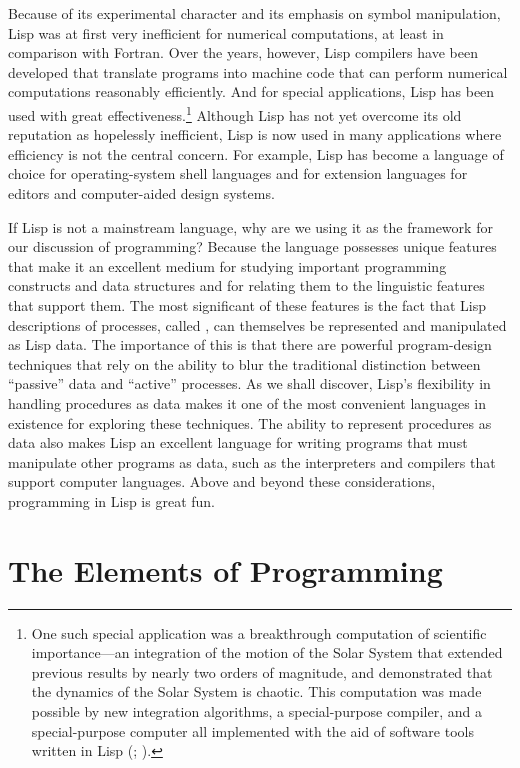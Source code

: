 Because of its experimental character and its emphasis on symbol manipulation,
Lisp was at first very inefficient for numerical computations, at least in
comparison with Fortran. Over the years, however, Lisp compilers have been
developed that translate programs into machine code that can perform numerical
computations reasonably efficiently. And for special applications, Lisp has
been used with great effectiveness.\footnote{One such special application was a
breakthrough computation of scientific importance---an integration of the
motion of the Solar System that extended previous results by nearly two orders
of magnitude, and demonstrated that the dynamics of the Solar System is
chaotic. This computation was made possible by new integration algorithms, a
special-purpose compiler, and a special-purpose computer all implemented with
the aid of software tools written in Lisp (; ).}
Although Lisp has not yet overcome its old reputation as
hopelessly inefficient, Lisp is now used in many applications where efficiency
is not the central concern. For example, Lisp has become a language of choice
for operating-system shell languages and for extension languages for editors
and computer-aided design systems.

If Lisp is not a mainstream language, why are we using it as the framework for
our discussion of programming? Because the language possesses unique features
that make it an excellent medium for studying important programming constructs
and data structures and for relating them to the linguistic features that
support them. The most significant of these features is the fact that Lisp
descriptions of processes, called , can themselves be
represented and manipulated as Lisp data. The importance of this is that there
are powerful program-design techniques that rely on the ability to blur the
traditional distinction between ``passive'' data and ``active'' processes. As
we shall discover, Lisp's flexibility in handling procedures as data makes it
one of the most convenient languages in existence for exploring these
techniques. The ability to represent procedures as data also makes Lisp an
excellent language for writing programs that must manipulate other programs as
data, such as the interpreters and compilers that support computer languages.
Above and beyond these considerations, programming in Lisp is great fun.

\section{The Elements of Programming}
\label{Section 1.1}


